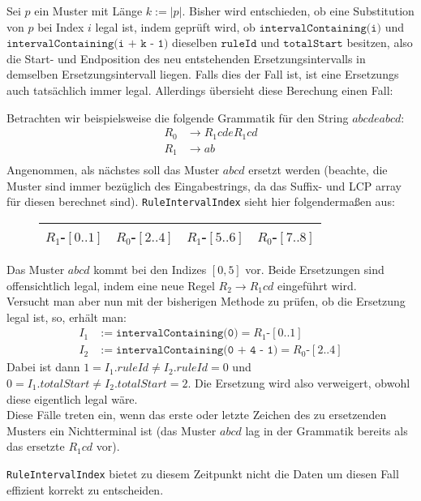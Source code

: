 Sei $p$ ein Muster mit Länge $k := |p|$. Bisher wird entschieden, ob eine Substitution von $p$ bei Index $i$ legal ist, indem geprüft wird, ob $\texttt{intervalContaining(i)}$ und $\texttt{intervalContaining(i + k - 1)}$ dieselben $\texttt{ruleId}$ und $\texttt{totalStart}$ besitzen, also die Start- und Endposition des neu entstehenden Ersetzungsintervalls in demselben Ersetzungsintervall liegen. Falls dies der Fall ist, ist eine Ersetzungs auch tatsächlich immer legal. Allerdings übersieht diese Berechung einen Fall:

Betrachten wir beispielsweise die folgende Grammatik für den String $abcdeabcd$:
\begin{align*}
	R_0 &\rightarrow R_1 c d e R_1 c d\\
	R_1 &\rightarrow a b\\
\end{align*}
Angenommen, als nächstes soll das Muster $abcd$ ersetzt werden (beachte, die Muster sind immer bezüglich des Eingabestrings, da das Suffix- und LCP array für diesen berechnet sind).
\texttt{RuleIntervalIndex} sieht hier folgendermaßen aus:
\begin{figure}[H]
	\centering
	\begin{tabular}{|c|c|c|c|} \hline
		$R_1$-$[0..1]$ & $R_0$-$[2..4]$ & $R_1$-$[5..6]$ & $R_0$-$[7..8]$ \\\hline
	\end{tabular}
\end{figure}

Das Muster $abcd$ kommt bei den Indizes $[0, 5]$ vor. Beide Ersetzungen sind offensichtlich legal, indem eine neue Regel $R_2 \rightarrow R_1cd$ eingeführt wird.\\ Versucht man aber nun mit der bisherigen Methode zu prüfen, ob die Ersetzung legal ist, so, erhält man:
\begin{align*}
	I_1 &:= \texttt{intervalContaining(0)} = R_1\text{-}[0..1]\\
	I_2 &:= \texttt{intervalContaining(0 + 4 - 1)} = R_0\text{-}[2..4]
\end{align*} 
Dabei ist dann $1 = I_1.ruleId \neq I_2.ruleId = 0$ und $0 = I_1.totalStart \neq I_2.totalStart = 2$. Die Ersetzung wird also verweigert, obwohl diese eigentlich legal wäre.\\
Diese Fälle treten ein, wenn das erste oder letzte Zeichen des zu ersetzenden Musters ein Nichtterminal ist (das Muster $abcd$ lag in der Grammatik bereits als das ersetzte $R_1 cd$ vor).

\texttt{RuleIntervalIndex} bietet zu diesem Zeitpunkt nicht die Daten um diesen Fall effizient korrekt zu entscheiden.